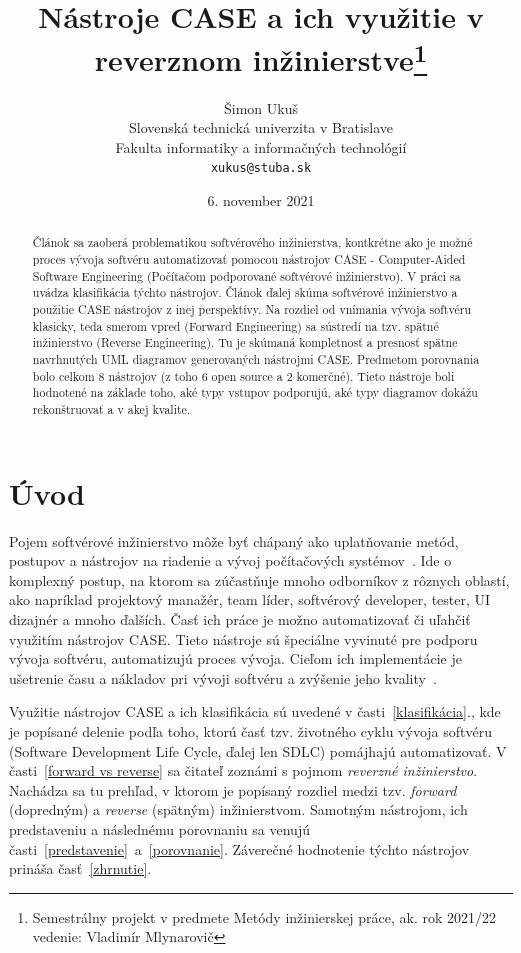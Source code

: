\documentclass[10pt,twoside,slovak,a4paper]{article}
\title{Nástroje CASE a ich využitie v reverznom inžinierstve\thanks{Semestrálny projekt v predmete Metódy inžinierskej práce, ak. rok 2021/22 vedenie: Vladimír Mlynarovič}} %
\author{Šimon Ukuš\\[2pt]
	{\small Slovenská technická univerzita v Bratislave}\\
	{\small Fakulta informatiky a informačných technológií}\\
	{\small \texttt{xukus@stuba.sk}}
	}
\date{\small 6. november 2021}
\begin{document}
\maketitle

\begin{abstract}
Článok sa zaoberá problematikou softvérového inžinierstva, kontkrétne ako je možné proces vývoja softvéru automatizovať pomocou nástrojov CASE - Computer-Aided Software Engineering (Počítačom podporované softvérové inžinierstvo). V práci sa uvádza klasifikácia týchto nástrojov.  Článok ďalej skúma softvérové inžinierstvo a použitie CASE nástrojov z inej perspektívy.  Na rozdiel od vnímania vývoja softvéru klasicky, teda smerom vpred (Forward Engineering) sa sústredí na tzv. spätné inžinierstvo (Reverse Engineering). Tu je skúmaná kompletnosť a presnosť spätne navrhnutých UML diagramov generovaných nástrojmi CASE. Predmetom porovnania bolo celkom 8 nástrojov (z toho 6 open source a 2 komerčné). Tieto nástroje boli hodnotené na základe toho, aké typy vstupov podporujú, aké typy diagramov dokážu rekonštruovať a v akej kvalite.
 
\end{abstract}



\section{Úvod}
Pojem softvérové inžinierstvo môže byť chápaný ako uplatňovanie metód, postupov a nástrojov na riadenie a vývoj počítačových systémov~\cite{1985}. Ide o komplexný postup, na ktorom sa zúčastňuje mnoho odborníkov z rôznych oblastí, ako napríklad projektový manažér, team líder, softvérový developer, tester, UI dizajnér a mnoho ďalších. Časť ich práce je možno automatizovať či uľahčiť využitím nástrojov CASE. Tieto nástroje sú špeciálne vyvinuté pre podporu vývoja softvéru, automatizujú proces vývoja. Cieľom ich implementácie je ušetrenie času a nákladov pri vývoji softvéru a zvýšenie jeho kvality~\cite{Osama:Adoption}.

Využitie nástrojov CASE a ich klasifikácia sú uvedené v časti~\ref{klasifikácia}., kde je popísané delenie podľa toho, ktorú časť tzv. životného cyklu vývoja softvéru (Software Development Life Cycle, ďalej len SDLC) pomájhajú automatizovať. 
V časti~\ref{forward vs reverse} sa čitateľ zoznámi s pojmom \emph{reverzné inžinierstvo}. Nachádza sa tu prehľad, v ktorom je popísaný rozdiel medzi tzv. \emph{forward} (dopredným) a \emph{reverse} (spätným) inžinierstvom. 
Samotným nástrojom, ich predstaveniu a následnému porovnaniu sa venujú časti~\ref{predstavenie}~a~\ref{porovnanie}.
Záverečné hodnotenie týchto nástrojov prináša časť~\ref{zhrnutie}.
\end{document}
